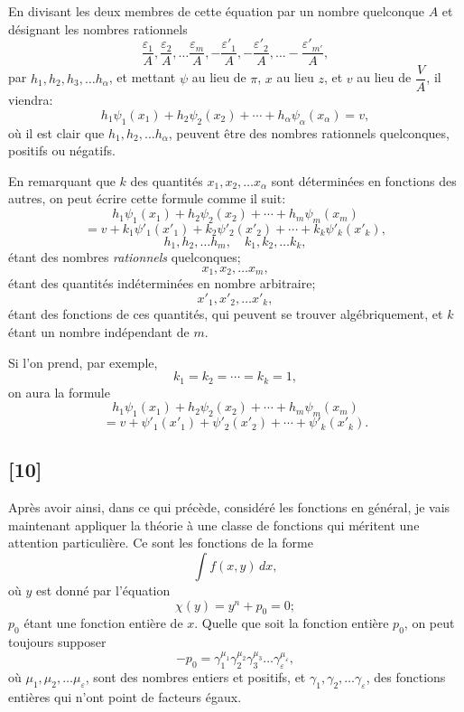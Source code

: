 \documentclass{article}
\begin{document}
En divisant les deux membres de cette équation par un nombre quelconque $A$ et désignant les nombres rationnels
\[ \frac{\varepsilon_1}{A}, \frac{\varepsilon_2}{A}, \ldots \frac{\varepsilon_m}{A}, -\frac{\varepsilon'_1}{A}, -\frac{\varepsilon'_2}{A}, \ldots -\frac{\varepsilon'_{m'}}{A}, \]
par $h_1, h_2, h_3, \ldots h_\alpha$, et mettant $\psi$ au lieu de $\pi$, $x$ au lieu $z$, et $v$ au lieu de $\dfrac{V}{A}$, il viendra:
\[ h_1\psi_1(x_1)+h_2\psi_2(x_2)+\cdots+h_\alpha\psi_\alpha(x_\alpha) = v, \tag{117} \]
où il est clair que $h_1, h_2, \ldots h_\alpha$, peuvent être des nombres rationnels quelconques, positifs ou négatifs.

En remarquant que $k$ des quantités $x_1, x_2, \ldots x_\alpha$ sont déterminées en fonctions des autres, on peut écrire cette formule comme il suit:
\[ h_1\psi_1(x_1)+h_2\psi_2(x_2)+\cdots+h_m\psi_m(x_m) \]
\[ = v+k_1\psi'_1(x'_1)+k_2\psi'_2(x'_2)+\cdots+k_k\psi'_k(x'_k), \tag{118} \]
\[ h_1, h_2, \ldots h_m, \quad k_1, k_2, \ldots k_k, \]
étant des nombres \emph{rationnels} quelconques;
\[ x_1, x_2, \ldots x_m, \]
étant des quantités indéterminées en nombre arbitraire;
\[ x'_1, x'_2, \ldots x'_k, \]
étant des fonctions de ces quantités, qui peuvent se trouver algébriquement, et $k$ étant un nombre indépendant de $m$.

Si l'on prend, par exemple,
\[ k_1 = k_2 = \cdots = k_k = 1, \]
on aura la formule
\[ h_1\psi_1(x_1)+h_2\psi_2(x_2)+\cdots+h_m\psi_m(x_m) \]
\[ = v+\psi'_1(x'_1)+\psi'_2(x'_2)+\cdots+\psi'_k(x'_k). \tag{119} \]

\subsection*{[10]}

Après avoir ainsi, dans ce qui précède, considéré les fonctions en général, je vais maintenant appliquer la théorie à une classe de fonctions qui méritent une attention particulière. Ce sont les fonctions de la forme
\[ \int f(x, y)\,dx, \tag{120} \]
où $y$ est donné par l'équation
\[ \chi(y) = y^{n} + p_0 = 0; \tag{121} \]
$p_0$ étant une fonction entière de $x$.
Quelle que soit la fonction entière $p_0$, on peut toujours supposer
\[ -p_0 = \gamma_1^{\mu_1}\gamma_2^{\mu_2}\gamma_3^{\mu_3} \ldots \gamma_\varepsilon^{\mu_\varepsilon}, \tag{122} \]
où $\mu_1, \mu_2, \ldots \mu_\varepsilon$, sont des nombres entiers et positifs, et $\gamma_1, \gamma_2, \ldots \gamma_\varepsilon$, des fonctions entières qui n'ont point de facteurs égaux.
\end{document}
